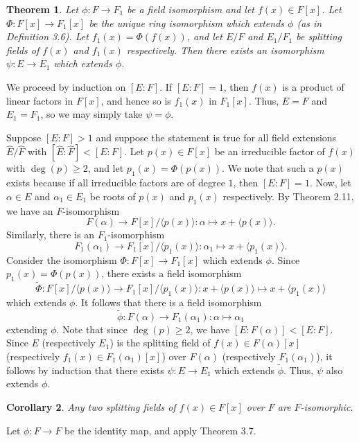 \documentclass[10pt]{article}
\makeatletter
\theoremstyle{newstyle}
\newtheorem{thm}{Theorem}[section]
\newtheorem{cor}[thm]{Corollary}
\newenvironment{pf}[1][\proofname]{\par
  \pushQED{\qed}%
  \normalfont \topsep0\p@\relax
  \trivlist
  \item[\hskip\labelsep\scshape
  #1\@addpunct{.}]\ignorespaces
}{%
  \popQED\endtrivlist\@endpefalse
}
\makeatother
\begin{document}
\begin{thm}
Let $\phi : F \to F_1$ be a field isomorphism and let $f(x) \in F[x]$. Let 
$\Phi : F[x] \to F_1[x]$ be the unique ring isomorphism which extends $\phi$ (as in Definition 3.6). 
Let $f_1(x) = \Phi(f(x))$, and let $E/F$ and $E_1/F_1$ be splitting fields of $f(x)$ and $f_1(x)$ 
respectively. Then there exists an isomorphism $\psi : E \to E_1$ which extends $\phi$. 
\end{thm}
\begin{pf}
We proceed by induction on $[E : F]$. If $[E : F] = 1$, then $f(x)$ is a product of linear factors 
in $F[x]$, and hence so is $f_1(x)$ in $F_1[x]$. Thus, $E = F$ and $E_1 = F_1$, so we may 
simply take $\psi = \phi$. 

Suppose $[E : F] > 1$ and suppose the statement is true for all field extensions 
$\widehat{E}/\widehat{F}$ with $[\widehat{E} : \widehat{F}] < [E : F]$. 
Let $p(x) \in F[x]$ be an irreducible factor of $f(x)$ with $\deg(p) \geq 2$, and let $p_1(x) 
= \Phi(p(x))$. We note that such a $p(x)$ exists because if all irreducible factors are of 
degree $1$, then $[E : F] = 1$. Now, let $\alpha \in E$ and $\alpha_1 \in E_1$ 
be roots of $p(x)$ and $p_1(x)$ respectively. By Theorem 2.11, we have an $F$-isomorphism 
\[ F(\alpha) \to F[x]/\langle p(x) \rangle : \alpha \mapsto x + \langle p(x) \rangle. \]
Similarly, there is an $F_1$-isomorphism 
\[ F_1(\alpha_1) \to F_1[x]/\langle p_1(x) \rangle : \alpha_1 \mapsto x + \langle p_1(x) \rangle. \]
Consider the isomorphism $\Phi : F[x] \to F_1[x]$ which extends $\phi$. Since 
$p_1(x) = \Phi(p(x))$, there exists a field isomorphism 
\[ \tilde{\Phi} : F[x]/\langle p(x) \rangle \to F_1[x]/\langle p_1(x) \rangle 
: x + \langle p(x) \rangle \mapsto x + \langle p_1(x) \rangle \]
which extends $\phi$. It follows that there is a field isomorphism 
\[ \tilde{\phi} : F(\alpha) \to F_1(\alpha_1) : \alpha \mapsto \alpha_1 \]
extending $\phi$. Note that since $\deg(p) \geq 2$, we have $[E : F(\alpha)] < [E : F]$. 
Since $E$ (respectively $E_1$) is the splitting field of $f(x) \in F(\alpha)[x]$ 
(respectively $f_1(x) \in F_1(\alpha_1)[x]$) over $F(\alpha)$ (respectively $F_1(\alpha_1)$), 
it follows by induction that there exists $\psi : E \to E_1$ which extends $\tilde\phi$. 
Thus, $\psi$ also extends $\phi$. 
\end{pf}

\begin{cor}
Any two splitting fields of $f(x) \in F[x]$ over $F$ are $F$-isomorphic.
\end{cor}
\begin{pf}
Let $\phi : F \to F$ be the identity map, and apply Theorem 3.7.
\end{pf}
\end{document}
